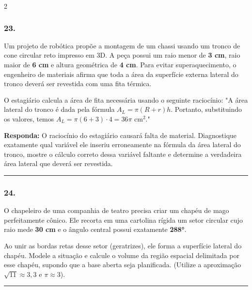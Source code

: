 \documentclass[twoside, 10pt, a4paper]{article}
\newlength{\espacoPreQuestao}\setlength{\espacoPreQuestao}{0.1cm}
\newlength{\espacoQuestao}\setlength{\espacoQuestao}{0.2cm}
\begin{document}
\begin{multicols*}{2}
\subsubsection*{23.} Um projeto de robótica propõe a montagem de um chassi usando um tronco de cone circular reto impresso em 3D. A peça possui um raio menor de \textbf{3 cm}, raio maior de \textbf{6 cm} e altura geométrica de \textbf{4 cm}. Para evitar superaquecimento, o engenheiro de materiais afirma que toda a área da superfície externa lateral do tronco deverá ser revestida com uma fita térmica.

O estagiário calcula a área de fita necessária usando o seguinte raciocínio:
"A área lateral do tronco é dada pela fórmula $ A_L = \pi (R + r) h $. Portanto, substituindo os valores, temos $ A_L = \pi (6 + 3) \cdot 4 = 36\pi \text{ cm}^2 $."

\begin{boxresponda}
\textbf{Responda:} O raciocínio do estagiário causará falta de material. Diagnostique exatamente qual variável ele inseriu erroneamente na fórmula da área lateral do tronco, mostre o cálculo correto dessa variável faltante e determine a verdadeira área lateral que deverá ser revestida.
\end{boxresponda}
\par\vspace{\espacoQuestao}

\noindent\textcolor{CorLinha}{\rule{\linewidth}{0.5pt}} 
\par\vspace{\espacoPreQuestao}
\subsubsection*{24.} O chapeleiro de uma companhia de teatro precisa criar um chapéu de mago perfeitamente cônico. Ele recorta em uma cartolina rígida um setor circular cujo raio mede \textbf{30 cm} e o ângulo central possui exatamente \textbf{288°}. 

Ao unir as bordas retas desse setor (geratrizes), ele forma a superfície lateral do chapéu. Modele a situação e calcule o volume da região espacial delimitada por esse chapéu, supondo que a base aberta seja planificada. (Utilize a aproximação $ \sqrt{11} \approx 3,3 $ e $ \pi \approx 3 $).
\par\vspace{\espacoQuestao}

\noindent\textcolor{CorLinha}{\rule{\linewidth}{0.5pt}} 
\par\vspace{\espacoPreQuestao}

\end{multicols*}
\end{document}

